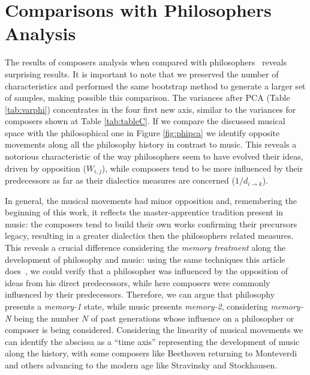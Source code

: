 \documentclass[
 aip,
 jmp,
 amsmath,amssymb,
 reprint,
]{revtex4-1}
\begin{document}
\section{Comparisons with Philosophers Analysis}

The results of composers analysis when compared with philosophers~\cite{Fabbri}
reveals surprising results. It is important to note that we preserved the
number of characteristics and performed the same bootstrap method to
generate a larger set of samples, making possible this
comparison. The variances after PCA (Table \ref{tab:varphi}) concentrates in the four
first new axis, similar to the variances for composers shown at Table \ref{tab:tableC}. If we compare the discussed musical space
with the philosophical one in Figure \ref{fig:phipca} we
identify opposite movements along all the philosophy history in contrast
to music. This reveals a notorious characteristic of the way
philosophers seem to have evolved their ideas, driven by opposition ($W_{i,j}$), while
composers tend to be more influenced by their predecessors as far as their dialectics measures are
concerned ($1/d_{i \rightarrow k}$).

In general, the musical movements had minor opposition and,
remembering the beginning of this work, it reflects the
master-apprentice
tradition present in music: the composers tend to build their own
works confirming their precursors legacy, resulting in a greater
dialectics then the philosophers related measures.
This reveals a crucial difference %
considering the \textit{memory treatment} along the development of
philosophy and music: using the same techniques this article does~\cite{Fabbri},
we could verify that a philosopher was influenced by the
opposition of ideas from his direct predecessors, while here composers were commonly
influenced by their predecessors. Therefore, we can argue that philosophy
presents a \textit{memory-1} state, while music presents
\textit{memory-2}, considering \textit{memory-N} being the number $N$
of past generations whose influence on a philosopher or
composer is being considered. Considering the linearity of musical movements we can
identify the abscissa as a ``time axis'' representing the development
of music along the history, with some composers
like Beethoven returning to Monteverdi and others advancing to the
modern age like Stravinsky and Stockhausen.
\end{document}
